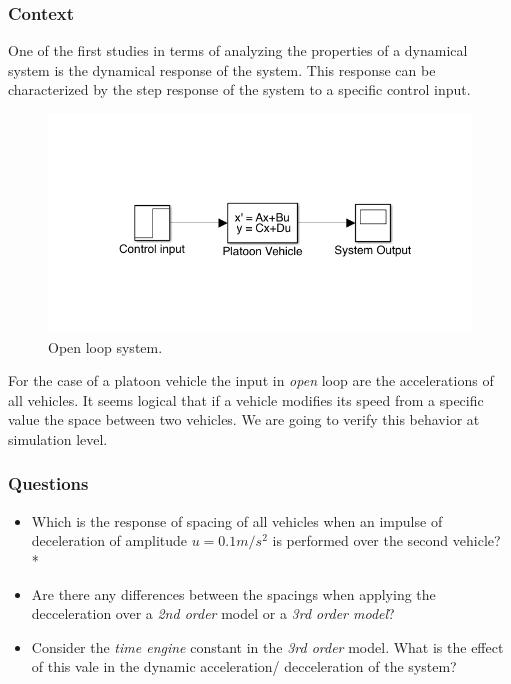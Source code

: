 \documentclass[]{book}
\providecommand{\tightlist}{%
  \setlength{\itemsep}{0pt}\setlength{\parskip}{0pt}}
\theoremstyle{definition}
\theoremstyle{definition}
\theoremstyle{definition}
\theoremstyle{remark}
\begin{document}
\hypertarget{context-6}{%
\subsubsection*{Context}\label{context-6}}

One of the first studies in terms of analyzing the properties of a
dynamical system is the dynamical response of the system. This response
can be characterized by the step response of the system to a specific
control input.



\begin{figure}

{\centering \includegraphics{images/p2-02-control-open} 

}

\caption{Open loop system.}\label{fig:opencav}
\end{figure}

For the case of a platoon vehicle the input in \emph{open} loop are the
accelerations of all vehicles. It seems logical that if a vehicle
modifies its speed from a specific value the space between two vehicles.
We are going to verify this behavior at simulation level.

\hypertarget{questions-5}{%
\subsubsection*{Questions}\label{questions-5}}

\begin{itemize}
\tightlist
\item
  Which is the response of spacing of all vehicles when an impulse of
  deceleration of amplitude \(u = 0.1m/s^2\) is performed over the
  second vehicle? *
\item
  Are there any differences between the spacings when applying the
  decceleration over a \emph{2nd order} model or a \emph{3rd order
  model}?
\item
  Consider the \emph{time engine} constant in the \emph{3rd order}
  model. What is the effect of this vale in the dynamic acceleration/
  decceleration of the system?
\end{itemize}
\end{document}
